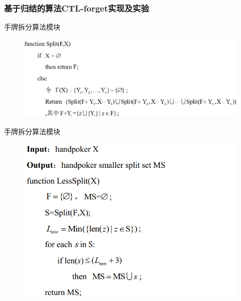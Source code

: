 \documentclass[9pt, CJK]{beamer}
\begin{document}
\begin{frame}
	\frametitle{基于归结的算法CTL-forget实现及实验}
	{\footnotesize
	}
\end{frame}

	\begin{frame}{手牌拆分算法模块}
		\begin{figure}
			\includegraphics[scale=0.28]{figures/split}
		\end{figure}
	\end{frame}
	
	\begin{frame}{手牌拆分算法模块}
		\begin{figure}
			\includegraphics[scale=0.4]{figures/jiyushoupai}
		\end{figure}
	\end{frame}
	
\end{document}
